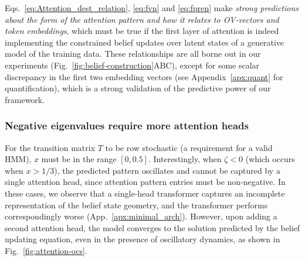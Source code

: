 \documentclass{article}
\theoremstyle{plain}
\theoremstyle{definition}
\theoremstyle{remark}
\newcommand{\stationary}{\boldsymbol{\pi}}
\begin{document}

Eqs.~\eqref{eq:Attention_dest_relation}, \eqref{eq:fvn} and \eqref{eq:fpren} make \emph{strong predictions 
about the form of the attention pattern and how it relates to 
OV-vectors and token embeddings},
which must be true if the first layer of attention is indeed implementing the constrained belief updates over latent states of a generative model of the training data.
These relationships are all
borne out in our experiments (Fig.~\ref{fig:belief-construction}ABC), 
except for some scalar discrepancy in the first two embedding vectors (see Appendix~\ref{apx:quant} for quantification),
which is a strong validation of the predictive power of our framework.



\subsubsection{Negative eigenvalues require more attention heads}


For the transition matrix $T$ to be row stochastic (a requirement for a valid HMM), $x$ must be in the range $[0, 0.5]$.
Interestingly, when $\zeta < 0$ (which occurs when $x > 1/3$), the predicted pattern oscillates and cannot be captured by a single attention head, since attention pattern entries must be non-negative. 
In these cases, we observe that a single-head transformer captures an incomplete representation of the belief state geometry, and the transformer performs correspondingly worse (App.~\ref{apx:minimal_arch}).
However, upon adding a second attention head, the model converges to the solution predicted by the belief updating equation, even in the presence of oscillatory dynamics, as shown in Fig.~\ref{fig:attention-ocs}.
\end{document}
